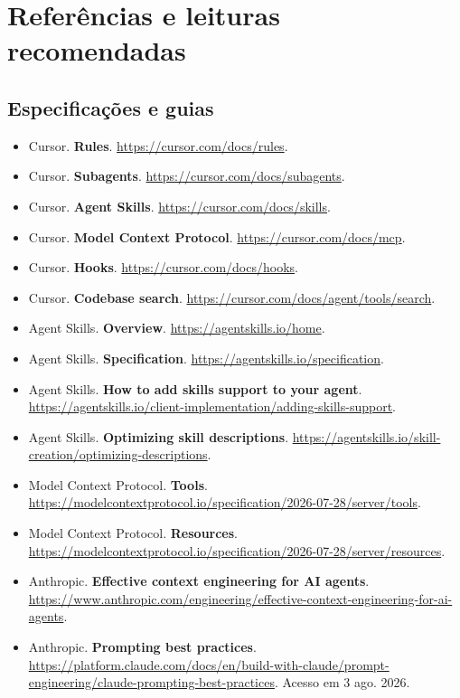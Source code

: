 \documentclass[
  10pt,
  a4paper,
  oneside]{book}
\providecommand{\tightlist}{%
  \setlength{\itemsep}{0pt}\setlength{\parskip}{0pt}}
\begin{document}
\newpage

\hypertarget{referuxeancias-e-leituras-recomendadas}{%
\chapter{Referências e leituras
recomendadas}\label{referuxeancias-e-leituras-recomendadas}}

\hypertarget{especificauxe7uxf5es-e-guias}{%
\section{Especificações e guias}\label{especificauxe7uxf5es-e-guias}}

\begin{itemize}
\tightlist
\item
  Cursor. \textbf{Rules}. \url{https://cursor.com/docs/rules}.
\item
  Cursor. \textbf{Subagents}. \url{https://cursor.com/docs/subagents}.
\item
  Cursor. \textbf{Agent Skills}. \url{https://cursor.com/docs/skills}.
\item
  Cursor. \textbf{Model Context Protocol}.
  \url{https://cursor.com/docs/mcp}.
\item
  Cursor. \textbf{Hooks}. \url{https://cursor.com/docs/hooks}.
\item
  Cursor. \textbf{Codebase search}.
  \url{https://cursor.com/docs/agent/tools/search}.
\item
  Agent Skills. \textbf{Overview}. \url{https://agentskills.io/home}.
\item
  Agent Skills. \textbf{Specification}.
  \url{https://agentskills.io/specification}.
\item
  Agent Skills. \textbf{How to add skills support to your agent}.
  \url{https://agentskills.io/client-implementation/adding-skills-support}.
\item
  Agent Skills. \textbf{Optimizing skill descriptions}.
  \url{https://agentskills.io/skill-creation/optimizing-descriptions}.
\item
  Model Context Protocol. \textbf{Tools}.
  \url{https://modelcontextprotocol.io/specification/2026-07-28/server/tools}.
\item
  Model Context Protocol. \textbf{Resources}.
  \url{https://modelcontextprotocol.io/specification/2026-07-28/server/resources}.
\item
  Anthropic. \textbf{Effective context engineering for AI agents}.
  \url{https://www.anthropic.com/engineering/effective-context-engineering-for-ai-agents}.
\item
  Anthropic. \textbf{Prompting best practices}.
  \url{https://platform.claude.com/docs/en/build-with-claude/prompt-engineering/claude-prompting-best-practices}.
  Acesso em 3 ago. 2026.
\end{itemize}
\end{document}
